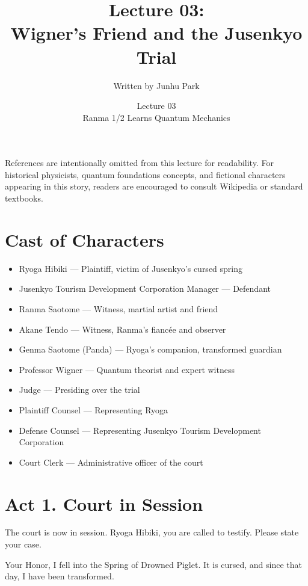 \documentclass[12pt]{article}
\title{Lecture 03: \\ Wigner's Friend and the Jusenkyo Trial}
\author{Written by Junhu Park}
\date{Lecture 03 \\ Ranma 1/2 Learns Quantum Mechanics}
\begin{document}
\maketitle

\begin{tcolorbox}[title=Note to the Reader]
References are intentionally omitted from this lecture for readability. For historical physicists, quantum foundations concepts, and fictional characters appearing in this story, readers are encouraged to consult Wikipedia or standard textbooks.
\end{tcolorbox}

\section*{Cast of Characters}

\begin{itemize}
    \item Ryoga Hibiki --- Plaintiff, victim of Jusenkyo's cursed spring
    \item Jusenkyo Tourism Development Corporation Manager --- Defendant
    \item Ranma Saotome --- Witness, martial artist and friend
    \item Akane Tendo --- Witness, Ranma's fiancée and observer
    \item Genma Saotome (Panda) --- Ryoga's companion, transformed guardian
    \item Professor Wigner --- Quantum theorist and expert witness
    \item Judge --- Presiding over the trial
    \item Plaintiff Counsel --- Representing Ryoga
    \item Defense Counsel --- Representing Jusenkyo Tourism Development Corporation
    \item Court Clerk --- Administrative officer of the court
\end{itemize}

\section*{Act 1. Court in Session}

\begin{tcolorbox}[title=Judge:]
The court is now in session. Ryoga Hibiki, you are called to testify. Please state your case.
\end{tcolorbox}

\begin{tcolorbox}[title=Ryoga:]
Your Honor, I fell into the Spring of Drowned Piglet. It is cursed, and since that day, I have been transformed.
\end{tcolorbox}
\end{document}
